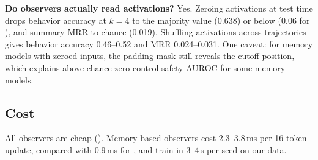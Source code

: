 {\bf Do observers actually read activations?}
Yes.
Zeroing activations at test time drops behavior accuracy at $k=4$ to the majority value (0.638) or below (0.06 for \directao), and summary MRR to chance (0.019).
Shuffling activations across trajectories gives behavior accuracy 0.46--0.52 and MRR 0.024--0.031.
One caveat: for memory models with zeroed inputs, the padding mask still reveals the cutoff position, which explains above-chance zero-control safety AUROC for some memory models.

\subsection{Cost}
\label{sec:cost}



All observers are cheap ().
Memory-based observers cost 2.3--3.8\,ms per 16-token update, compared with 0.9\,ms for \directao, and train in 3--4\,s per seed on our data.
